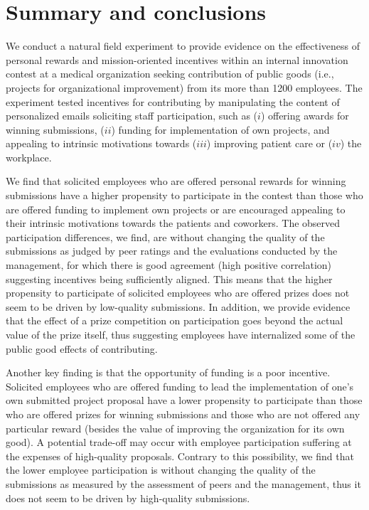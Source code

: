 \documentclass[11pt, titlepage]{article}
\begin{document}
\section{Summary and conclusions}\label{summary-and-conclusions}

We conduct a natural field experiment to provide evidence on the
effectiveness of personal rewards and mission-oriented incentives within
an internal innovation contest at a medical organization seeking
contribution of public goods (i.e., projects for organizational
improvement) from its more than 1200 employees. The experiment tested
incentives for contributing by manipulating the content of personalized
emails soliciting staff participation, such as (\(i\)) offering awards
for winning submissions, (\(ii\)) funding for implementation of own
projects, and appealing to intrinsic motivations towards (\(iii\))
improving patient care or (\(iv\)) the workplace.

We find that solicited employees who are offered personal rewards for
winning submissions have a higher propensity to participate in the
contest than those who are offered funding to implement own projects or
are encouraged appealing to their intrinsic motivations towards the
patients and coworkers. The observed participation differences, we find,
are without changing the quality of the submissions as judged by peer
ratings and the evaluations conducted by the management, for which there
is good agreement (high positive correlation) suggesting incentives
being sufficiently aligned. This means that the higher propensity to
participate of solicited employees who are offered prizes does not seem
to be driven by low-quality submissions. In addition, we provide
evidence that the effect of a prize competition on participation goes
beyond the actual value of the prize itself, thus suggesting employees
have internalized some of the public good effects of contributing.

Another key finding is that the opportunity of funding is a poor
incentive. Solicited employees who are offered funding to lead the
implementation of one's own submitted project proposal have a lower
propensity to participate than those who are offered prizes for winning
submissions and those who are not offered any particular reward (besides
the value of improving the organization for its own good). A potential
trade-off may occur with employee participation suffering at the
expenses of high-quality proposals. Contrary to this possibility, we
find that the lower employee participation is without changing the
quality of the submissions as measured by the assessment of peers and
the management, thus it does not seem to be driven by high-quality
submissions.
\end{document}
